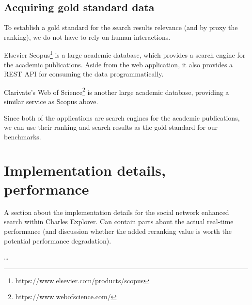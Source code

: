 \subsection{Acquiring gold standard data}

To establish a gold standard for the search results relevance (and by proxy the ranking), we do not have to rely on human interactions.

Elsevier Scopus\footnote{https://www.elsevier.com/products/scopus} is a large academic database, which provides a search engine for the academic publications.
Aside from the web application, it also provides a REST API for consuming the data programmatically.

Clarivate's Web of Science\footnote{https://www.webofscience.com/} is another large academic database, providing a similar service as Scopus above.

Since both of the applications are search engines for the academic publications, we can use their ranking and search results as the gold standard for our benchmarks.

\section{Implementation details, performance}

A section about the implementation details for the social network enhanced search within Charles Explorer. Can contain parts about the actual real-time performance (and discussion whether the added reranking value is worth the potential performance degradation).

\dots

